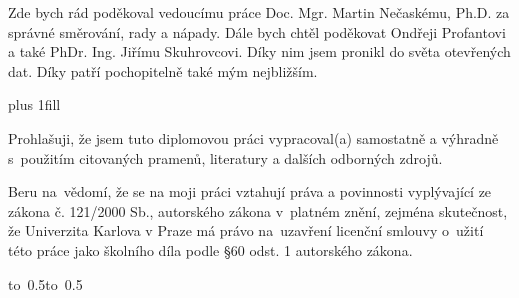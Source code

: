 \documentclass[12pt,a4paper]{report}
\let\openright=\clearpage
\begin{document}
\newpage



\openright

\noindent
Zde bych rád poděkoval vedoucímu práce Doc. Mgr. Martin Nečaskému, Ph.D. za správné směrování, rady a nápady. Dále bych chtěl poděkovat Ondřeji Profantovi a také PhDr. Ing. Jiřímu Skuhrovcovi. Díky nim jsem pronikl do světa otevřených dat. Díky patří pochopitelně také mým nejbližším. 

\newpage


\vglue 0pt plus 1fill

\noindent
Prohlašuji, že jsem tuto diplomovou práci vypracoval(a) samostatně a výhradně
s~použitím citovaných pramenů, literatury a dalších odborných zdrojů.

\medskip\noindent
Beru na~vědomí, že se na moji práci vztahují práva a povinnosti vyplývající
ze zákona č. 121/2000 Sb., autorského zákona v~platném znění, zejména skutečnost,
že Univerzita Karlova v Praze má právo na~uzavření licenční smlouvy o~užití této
práce jako školního díla podle §60 odst. 1 autorského zákona.

\vspace{10mm}

\hbox{\hbox to 0.5\hbox to 0.5}

\vspace{20mm}
\newpage

\end{document}
